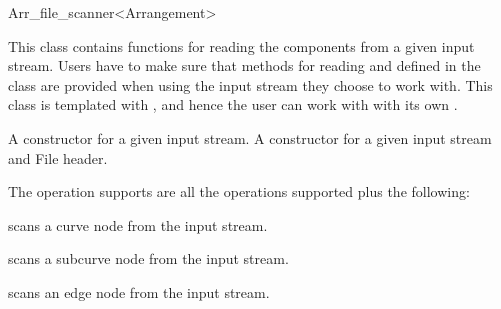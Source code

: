 
\ccRefPageBegin


\begin{ccRefClass}{Arr_file_scanner<Arrangement>}


\ccDefinition
This class contains functions for reading the  components from a given input stream. 
Users have to make sure that methods for reading  and  defined in  
the  class are provided when using the input stream they choose to work with.
This class is templated with , and hence the user can work with \ccRefName \/ 
with its own . 
 
\ccInheritsFrom
{}


\ccTypes



\ccCreation
    
{A constructor for a given input stream.}
{A constructor for a given input stream and File header.}

The operation \ccRefName \/ supports are all the operations  supported plus the following:

\ccOperations

{scans a curve node from the input stream.}

{scans a subcurve node from the input stream.}

{scans an edge node from the input stream.}


\end{ccRefClass} %

